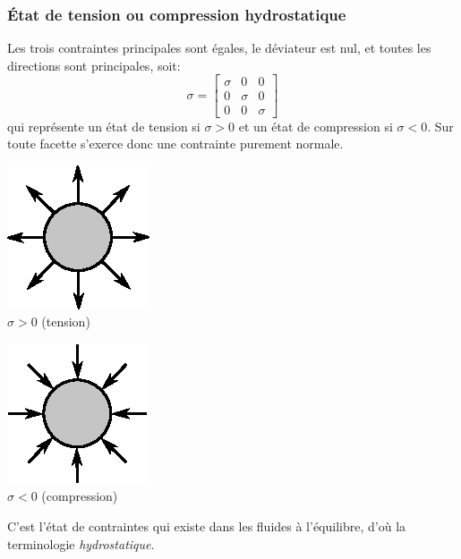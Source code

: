 \subsubsection{État de tension ou compression hydrostatique}
Les trois contraintes principales sont égales, le déviateur est nul, et toutes les directions sont principales, soit:
\begin{equation}
    \mathbb{\sigma} = 
    \begin{bmatrix}
        \sigma & 0 & 0 \\
        0 & \sigma & 0 \\
        0 & 0 & \sigma
    \end{bmatrix}
    \label{eq:Ch02-017}
\end{equation}
qui représente un état de tension si $\sigma > 0$ et un état de compression si $\sigma < 0$.
Sur toute facette s'exerce donc une contrainte purement normale.
\begin{multicols}{2}
    \begin{center}
        \includegraphics{../images/T1_Ch02-0006a}\\
        $\sigma > 0$ (tension)
    \end{center}
    \columnbreak
    \begin{center}
        \includegraphics{../images/T1_Ch02-0006b}\\
        $\sigma < 0$ (compression)
    \end{center}
\end{multicols}
C'est l'état de contraintes qui existe dans les fluides à l'équilibre, d'où la terminologie \emph{hydrostatique}.
